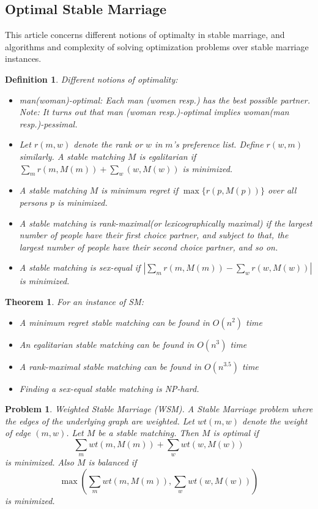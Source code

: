 \documentclass{article}
\newtheorem{theorem}[fact]{Theorem}
\newtheorem{definition}[fact]{Definition}
\newtheorem{problem}[fact]{Problem}
\begin{document}
\subsection{Optimal Stable Marriage}
This article \cite{irving2008optimal} concerns different notions of optimalty in stable marriage, and algorithms and complexity of solving optimization problems over stable marriage instances.
\begin{definition}
Different notions of optimality:
\begin{itemize}
\item man(woman)-optimal: Each man (women resp.) has the best possible partner. Note: It turns out that man (woman resp.)-optimal implies woman(man resp.)-pessimal.
\item Let $r(m,w)$ denote the rank or $w$ in $m$'s preference list. Define $r(w,m)$ similarly. A stable matching $M$ is egalitarian if $\sum_m  r(m, M(m)) + \sum_w (w, M(w))$ is minimized.
\item A stable matching $M$ is minimum regret if $\max\{r(p,M(p))\}$ over all persons $p$ is minimized.
\item A stable matching is rank-maximal(or lexicographically maximal) if the largest number of people have their first choice partner, and subject to that, the largest number of people have their second choice partner, and so on.
\item A stable matching is sex-equal if $|\sum_m r(m, M(m)) - \sum_w r(w, M(w))|$ is minimized.
\end{itemize}
\end{definition}
\begin{theorem}
For an instance of SM:
\begin{itemize}
\item A minimum regret stable matching can be found in $O(n^2)$ time
\item An egalitarian stable matching can be found in $O(n^3)$ time
\item A rank-maximal stable matching can be found in $O(n^{3.5})$ time
\item Finding a sex-equal stable matching is NP-hard.
\end{itemize}
\end{theorem}
\begin{problem}
Weighted Stable Marriage (WSM). A Stable Marriage problem where the edges of the underlying graph are weighted. Let $wt(m,w)$ denote the weight of edge $(m,w)$. Let $M$ be a stable matching. Then $M$ is optimal if $$\sum_m wt(m,M(m)) + \sum_w wt(w, M(w))$$ is minimized. Also $M$ is balanced if $$\max(\sum_m wt(m, M(m)), \sum_w wt(w,M(w)))$$ is minimized.
\end{problem}
\end{document}
